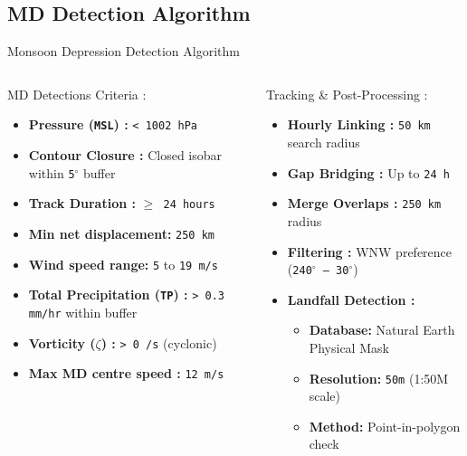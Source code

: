 \subsection{MD Detection Algorithm}
\begin{frame}{Monsoon Depression Detection Algorithm}
	\vspace{-0.1cm}
	\begin{columns}[T, onlytextwidth]
		\footnotesize
		\begin{block}{MD Detections Criteria :}
			\begin{itemize}
				\item \textbf{Pressure (\texttt{MSL}) :} \texttt{< 1002 hPa}
				\item \textbf{Contour Closure :} Closed isobar within \texttt{5$^{\circ}$} buffer
				\item \textbf{Track Duration :} \texttt{$\geq$ 24 hours}
				\item \textbf{Min net displacement:} \texttt{250 km}
				\item \textbf{Wind speed range\footnotemark[1] :} \texttt{5} to \texttt{19 m/s}
				\item \textbf{Total Precipitation (\texttt{TP}) :} \texttt{> 0.3 mm/hr} within buffer
				\item \textbf{Vorticity (\texttt{$\zeta$}) :} \texttt{> 0 /s} (cyclonic)
				\item \textbf{Max MD centre speed :} \texttt{12 m/s}
			\end{itemize}
		\end{block}

		\footnotesize
		\begin{block}{Tracking \& Post-Processing :}
			\begin{itemize}
				\item \textbf{Hourly Linking :} \texttt{50 km} search radius
				\item \textbf{Gap Bridging :} Up to \texttt{24 h}
				\item \textbf{Merge Overlaps :} \texttt{250 km} radius
				\item \textbf{Filtering :} WNW preference (\texttt{240$^{\circ}$ – 30$^{\circ}$})
				\item \textbf{Landfall Detection :}
				      \begin{itemize}
					      \footnotesize
					      \item \textbf{Database:} Natural Earth Physical Mask
					      \item \textbf{Resolution:} \texttt{50m} (1:50M scale)
					      \item \textbf{Method:} Point-in-polygon check
				      \end{itemize}
			\end{itemize}
		\end{block}


\end{columns}
\end{frame}
